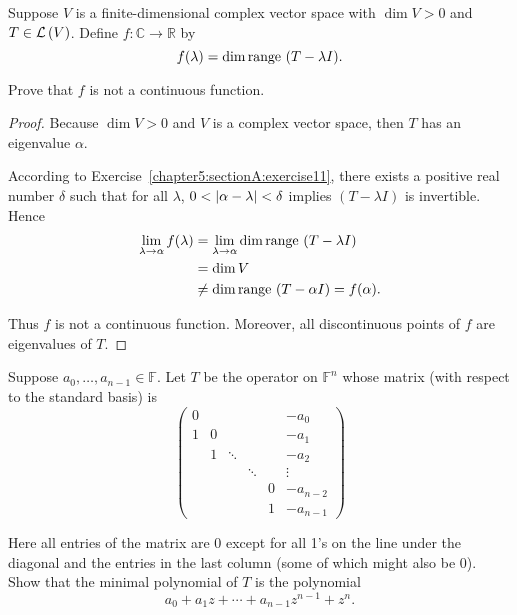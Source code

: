 \begin{exercise}
    Suppose $V$ is a finite-dimensional complex vector space with $\dim V > 0$ and $T\in\mathcal{L}\left({V}\right)$. Define $f: \mathbb{C}\to \mathbb{R}$ by
    \[
        f(\lambda) = \dim\operatorname{range}\,{(T - \lambda I)}.
    \]

    Prove that $f$ is not a continuous function.
\end{exercise}

\begin{proof}
    Because $\dim V > 0$ and $V$ is a complex vector space, then $T$ has an eigenvalue $\alpha$.

    According to Exercise~\ref{chapter5:sectionA:exercise11}, there exists a positive real number $\delta$ such that for all $\lambda$, $0 < \left\vert{\alpha - \lambda}\right\vert < \delta$ implies $(T - \lambda I)$ is invertible. Hence
    \begin{align*}
        \lim\limits_{\lambda\to \alpha} f(\lambda) & = \lim\limits_{\lambda\to \alpha} \dim\operatorname{range}\,{(T - \lambda I)} \\
                                                   & = \dim V                                                      \\
                                                   & \ne \dim\operatorname{range}\,{(T - \alpha I)} = f(\alpha).
    \end{align*}

    Thus $f$ is not a continuous function. Moreover, all discontinuous points of $f$ are eigenvalues of $T$.
\end{proof}
\newpage

\begin{exercise}
    Suppose $a_{0}, \ldots, a_{n-1}\in\mathbb{F}$. Let $T$ be the operator on $\mathbb{F}^{n}$ whose matrix (with respect to the standard basis) is
    \[
        \begin{pmatrix}
            0 &   &        &        &   & -a_{0}   \\
            1 & 0 &        &        &   & -a_{1}   \\
              & 1 & \ddots &        &   & -a_{2}   \\
              &   &        & \ddots &   & \vdots   \\
              &   &        &        & 0 & -a_{n-2} \\
              &   &        &        & 1 & -a_{n-1}
        \end{pmatrix}
    \]

    Here all entries of the matrix are $0$ except for all 1's on the line under the
    diagonal and the entries in the last column (some of which might also be $0$). Show that the minimal polynomial of $T$ is the polynomial
    \[
        a_{0} + a_{1}z + \cdots + a_{n-1}z^{n-1} + z^{n}.
    \]
\end{exercise}

